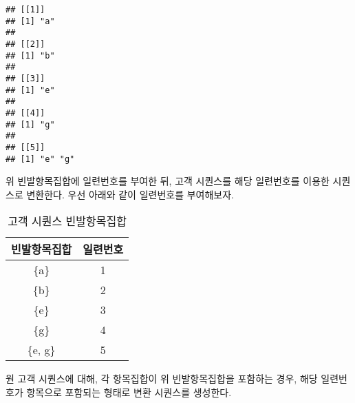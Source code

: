 \documentclass[]{book}
\newenvironment{Shaded}{\begin{snugshade}}{\end{snugshade}}
\newcommand{\DataTypeTok}[1]{\textcolor[rgb]{0.13,0.29,0.53}{#1}}
\newcommand{\KeywordTok}[1]{\textcolor[rgb]{0.13,0.29,0.53}{\textbf{#1}}}
\newcommand{\NormalTok}[1]{#1}
\newcommand{\OperatorTok}[1]{\textcolor[rgb]{0.81,0.36,0.00}{\textbf{#1}}}
\newcommand{\OtherTok}[1]{\textcolor[rgb]{0.56,0.35,0.01}{#1}}
\newcommand{\StringTok}[1]{\textcolor[rgb]{0.31,0.60,0.02}{#1}}
\begin{document}
\begin{verbatim}
## [[1]]
## [1] "a"
## 
## [[2]]
## [1] "b"
## 
## [[3]]
## [1] "e"
## 
## [[4]]
## [1] "g"
## 
## [[5]]
## [1] "e" "g"
\end{verbatim}

위 빈발항목집합에 일련번호를 부여한 뒤, 고객 시퀀스를 해당 일련번호를 이용한 시퀀스로 변환한다. 우선 아래와 같이 일련번호를 부여해보자.

\begin{Shaded}
\end{Shaded}

\begin{table}[t]

\caption{\label{tab:association-sequence-large-itemsets}고객 시퀀스 빈발항목집합}
\centering
\begin{tabular}{cc}
\toprule
빈발항목집합 & 일련번호\\
\midrule
\{a\} & 1\\
\{b\} & 2\\
\{e\} & 3\\
\{g\} & 4\\
\{e, g\} & 5\\
\bottomrule
\end{tabular}
\end{table}

원 고객 시퀀스에 대해, 각 항목집합이 위 빈발항목집합을 포함하는 경우, 해당 일련번호가 항목으로 포함되는 형태로 변환 시퀀스를 생성한다.
\end{document}
